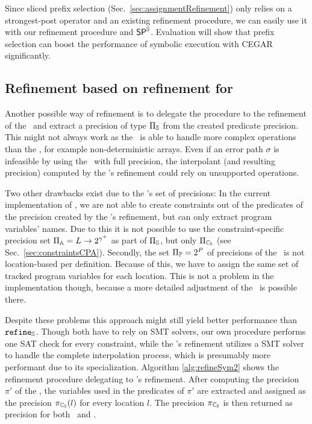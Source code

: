 Since sliced prefix selection (Sec.~\ref{sec:assignmentRefinement}) only relies on a strongest-post operator and an existing refinement procedure, we can easily use it with our refinement procedure and $\operatorname{\operatorname{\operatorname{\mathsf{SP}}}^{\mathbb{S}}}$.
Evaluation will show that prefix selection can boost the performance of symbolic execution with CEGAR significantly.

\subsection{Refinement based on refinement for \predicateCPA}
\label{sec:predicateRefinement}
Another possible way of refinement is to delegate the procedure to the refinement of the \predicateCPA\ and extract  a precision of type $\Pi_{\mathbb{S}}$ from the created predicate precision.
This might not always work as the \predicateCPA\ is able to handle more complex operations than the \symbolicExecutionCPA, for example non-deterministic arrays.
Even if an error path $\sigma$ is infeasible by using the \symbolicExecutionCPA\ with full precision, the interpolant (and resulting precision) computed by the \predicateCPA 's refinement could rely on unsupported operations.

Two other drawbacks exist due to the \predicateCPA's set of precisions:
In the current implementation of \CpaChecker, we are not able to create constraints out of the predicates of the precision created by the \predicateCPA's refinement, but can only extract program variables' names.
Due to this it is not possible to use the constraint-specific precision set $\Pi_{\mathbb{A}} = L \rightarrow 2^{\gamma^+}$ as part of $\Pi_{\mathbb{S}}$, but only $\Pi_{\mathbb{C_{S}}}$ (see Sec.~\ref{sec:constraintsCPA}).
Secondly, the set $\Pi_{\mathbb{P}} = 2^P$ of precisions of the \predicateCPA\ is not location-based per definition. Because of this, we have to assign the same set of tracked program variables for each location.
This is not a problem in the implementation though, because a more detailed adjustment of the \predicateCPA\ is possible there.

Despite these problems this approach might still yield better performance than $\texttt{refine}_{\mathbb{S}}$.
Though both have to rely on SMT solvers, our own procedure performs one SAT check for every constraint, while the \predicateCPA's refinement utilizes a SMT solver to handle the complete interpolation process, which is presumably more performant due to its specialization.
Algorithm \ref{alg:refineSym2} shows the refinement procedure delegating to \predicateCPA's refinement.
After computing the precision $\pi'$ of the \predicateCPA, the variables used in the predicates of $\pi'$ are extracted and assigned as the precision $\pi_{\mathbb{C_{S}}}(l)$ for every location $l$. The precision $\pi_{\mathbb{C_{S}}}$ is then returned as precision for both \symbolicValueAnalysisCPA\ and \constraintsCPA.

